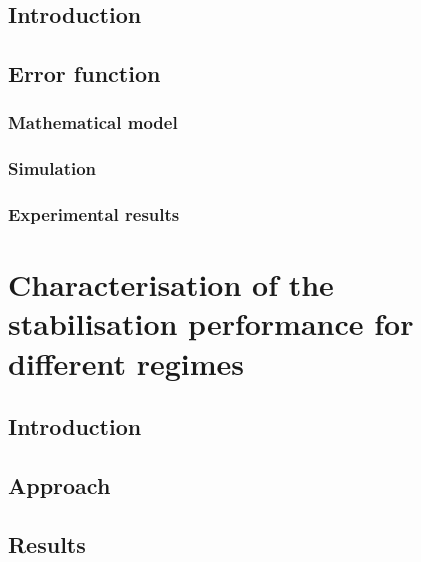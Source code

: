 
\subsection{Introduction}


\subsection{Error function}


\subsubsection{Mathematical model}


\subsubsection{Simulation}


\subsubsection{Experimental results}


\section{Characterisation of the stabilisation performance for different regimes}


\subsection{Introduction}


\subsection{Approach}


\subsection{Results}